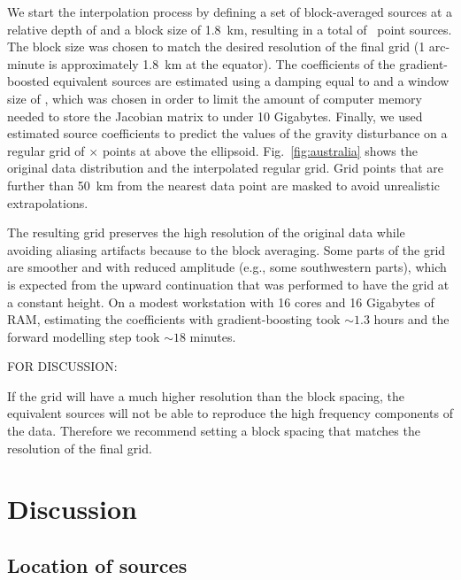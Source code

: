 \documentclass[twocolumn]{article}
\begin{document}
We start the interpolation process by defining a set of block-averaged sources
at a relative depth of \AustraliaEqlDepth{} and a block size of
\SI{1.8}{\kilo\meter}, resulting in a total of \AustraliaEqlNSources{}~point
sources.
The block size was chosen to match the desired resolution of the final grid (1
arc-minute is approximately \SI{1.8}{\kilo\meter} at the equator).
The coefficients of the gradient-boosted equivalent sources are estimated using
a damping equal to \AustraliaEqlDamping{} and a window size of
\AustraliaEqlWindowSize{}, which was chosen in order to limit the amount of
computer memory needed to store the Jacobian matrix to under 10 Gigabytes.
Finally, we used estimated source coefficients to predict the values of the
gravity disturbance on a regular grid of
\AustraliaEqlGridNLongitude{}$\times$\AustraliaEqlGridNLatitude{} points at
\AustraliaEqlGridHeight{} above the ellipsoid.
Fig.~\ref{fig:australia} shows the original data distribution and the
interpolated regular grid.
Grid points that are further than \SI{50}{\kilo\meter} from the nearest data
point are masked to avoid unrealistic extrapolations.

The resulting grid preserves the high resolution of the original data while
avoiding aliasing artifacts because to the block averaging.
Some parts of the grid are smoother and with reduced amplitude (e.g., some
southwestern parts), which is expected from the upward continuation that was
performed to have the grid at a constant height.
On a modest workstation with 16 cores and 16 Gigabytes of RAM,
estimating the \AustraliaEqlNSources{} coefficients with gradient-boosting took
$\sim 1.3$ hours and the forward modelling step took $\sim 18$ minutes.

FOR DISCUSSION:

If the grid will have a much higher resolution than the block spacing, the
equivalent sources will not be able to reproduce the high frequency components
of the data.
Therefore we recommend setting a block spacing that matches the resolution of
the final grid.



\section{Discussion}

\subsection{Location of sources}
\end{document}
